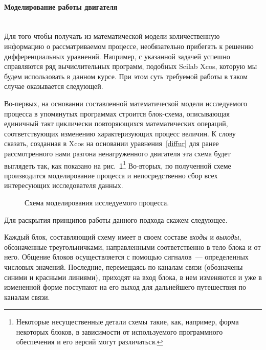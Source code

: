 \documentclass[12pt,a4paper,openany]{extarticle}
\begin{document}
\paragraph*{Моделирование работы двигателя}$\phantom{-}$\\
\hspace*{\parindent}Для того чтобы получать из математической модели количественную информацию о рассматриваемом процессе, необязательно прибегать к решению дифференциальных уравнений.
Например, с указанной задачей успешно справляются ряд вычислительных программ, подобных Scilab Xcos, которую мы будем использовать в данном курсе.
При этом суть требуемой работы в таком случае оказывается следующей. 

Во-первых, на основании составленной математической модели исследуемого процесса в упомянутых программах строится блок-схема, описывающая единичный такт циклически повторяющихся математических операций, соответствующих изменению характеризующих процесс величин.
К слову сказать, созданная в Xcos на основании уравнения~\eqref{diffur} для ранее рассмотренного нами разгона ненагруженного двигателя эта схема будет выглядеть так, как показано на рис.~\ref{struct_sheme}\footnote{Некоторые несущественные детали схемы такие, как, например, форма некоторых блоков, в зависимости от используемого программного обеспечения и его версий могут различаться.}
Во-вторых, по полученной схеме производится моделирование процесса и непосредственно сбор всех интересующих исследователя данных.

\begin{figure}[h]
	\noindent{}
	\caption{Схема моделирования исследуемого процесса.}
	\label{struct_sheme}
\end{figure}

Для раскрытия принципов работы данного подхода скажем следующее.

Каждый блок, составляющий схему имеет в своем составе {\itshape входы} и {\itshape выходы}, обозначенные треугольничками, направленными соответственно в тело блока и от него. 
Общение блоков осуществляется с помощью сигналов~--- определенных числовых значений. 
Последние, перемещаясь по каналам связи (обозначены синими и красными линиями), приходят на вход блока, в нем изменяются и уже в измененной форме поступают на его выход для дальнейшего путешествия по каналам связи. 
\end{document}
